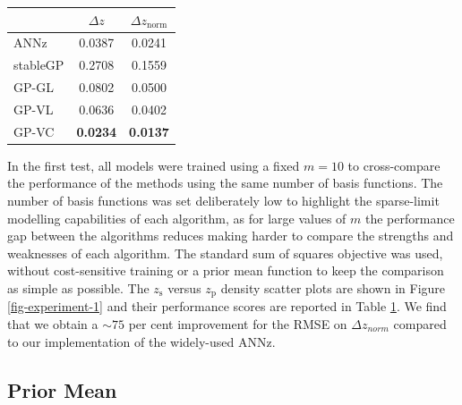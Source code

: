 \documentclass[useAMS,usenatbib,fleqn]{mn2e}
\begin{document}
 \begin{table}
\begin{center}
  \begin{tabular}{| l | c | c | }
     				&	$\Delta z$	&	$\Delta z_\textrm{norm}$	\\	\hline
	ANNz		&	0.0387			&	0.0241				\\
	stableGP		&	0.2708			&	0.1559				\\
	GP-GL		&	0.0802			&	0.0500				\\
	GP-VL		&	0.0636			&	0.0402				\\
	GP-VC		&	\textbf{0.0234}		&	\textbf{0.0137}			\\	\hline
  \end{tabular}
  \label{table-experiment-1}
\end{center}
\end{table}


In the first test, all models were trained using a fixed $m=10$ to cross-compare the performance of the methods using the same number of basis functions. The number of basis functions was set deliberately low to highlight the sparse-limit modelling capabilities of each algorithm, as for large values of $m$ the performance gap between the algorithms reduces making harder to compare the strengths and weaknesses of each algorithm. The standard sum of squares objective was used, without cost-sensitive training or a prior mean function to keep the comparison as simple as possible. The $z_\textrm{s}$ versus $z_\textrm{p}$ density scatter plots are shown in Figure \ref{fig-experiment-1} and their performance scores are reported in Table \ref{table-experiment-1}. We find that we obtain a $\sim 75$ per cent improvement for the RMSE on $\Delta z_{norm}$ compared to our implementation of the widely-used ANNz.

\subsection{Prior Mean}
\end{document}
